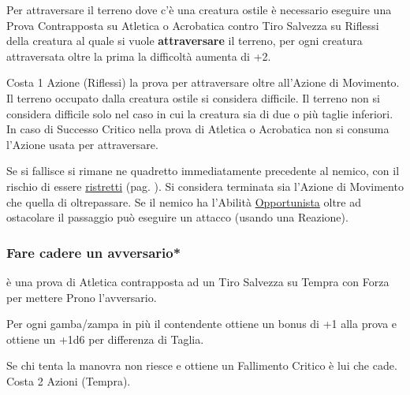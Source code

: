 \begin{multicols}{2}
Per attraversare il terreno dove c'è una creatura ostile è necessario eseguire una Prova Contrapposta su Atletica o Acrobatica contro Tiro Salvezza su Riflessi della creatura al quale si vuole \textbf{attraversare} il terreno, per ogni creatura attraversata oltre la prima la difficoltà aumenta di +2.

Costa 1 Azione (Riflessi) la prova per attraversare oltre all'Azione di Movimento. Il terreno occupato dalla creatura ostile si considera difficile. Il terreno non si considera difficile solo nel caso in cui la creatura sia di due o più taglie inferiori. In caso di Successo Critico nella prova di Atletica o Acrobatica non si consuma l'Azione usata per attraversare.

Se si fallisce si rimane ne quadretto immediatamente precedente al nemico, con il rischio di essere \hyperlink{ristretti}{ristretti} (pag. \pageref{ristretti}). Si considera terminata sia l'Azione di Movimento che quella di oltrepassare.
Se il nemico ha l'Abilità \hyperlink{opportunista}{Opportunista} oltre ad ostacolare il passaggio può eseguire un attacco (usando una Reazione).

%

\subsubsection{Fare cadere un avversario*} \label{farecadereavversario}\hypertarget{farecadereavversario}{}

è una prova di Atletica contrapposta ad un Tiro Salvezza su Tempra con Forza per mettere Prono l'avversario.

Per ogni gamba/zampa in più il contendente ottiene un bonus di +1 alla prova e ottiene un +1d6 per differenza di Taglia.

Se chi tenta la manovra non riesce e ottiene un Fallimento Critico è lui che cade. Costa 2 Azioni (Tempra).




\end{multicols}
